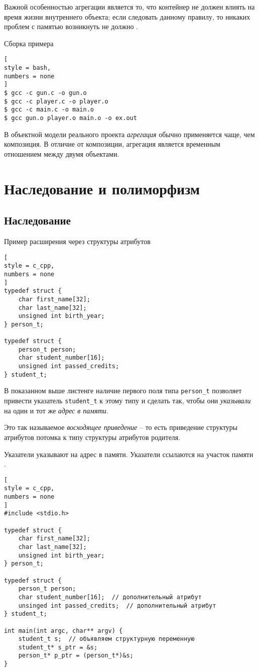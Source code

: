 \documentclass[%
	11pt,
	a4paper,
	utf8,
		]{article}
\begin{document}
Важной особенностью агрегации является то, что {\color{red}контейнер не должен влиять на время жизни внутреннего объекта}; если следовать данному правилу, то никаких проблем с памятью возникнуть не должно \cite[]{amini-extreme-c:2022}.

Сборка примера
\begin{lstlisting}[
style = bash,
numbers = none
]
$ gcc -c gun.c -o gun.o
$ gcc -c player.c -o player.o
$ gcc -c main.c -o main.o
$ gcc gun.o player.o main.o -o ex.out
\end{lstlisting}

В объектной модели реального проекта \emph{агрегация} обычно применяется чаще, чем композиция. В отличие от композиции, агрегация является временным отношением между двумя объектами.

\section{Наследование и полиморфизм}

\subsection{Наследование}

Пример расширения через структуры атрибутов
\begin{lstlisting}[
style = c_cpp,
numbers = none
]
typedef struct {
    char first_name[32];
    char last_name[32];
    unsigned int birth_year;
} person_t;

typedef struct {
    person_t person;
    char student_number[16];
    unsigned int passed_credits;
} student_t;
\end{lstlisting}

В показанном выше листенге наличие первого поля типа \verb|person_t| позволяет привести указатель \verb|student_t| к этому типу и сделать так, чтобы они \emph{указывали} на один и тот же \emph{адрес в памяти}.

Это так называемое \emph{восходящее приведение} -- то есть приведение структуры атрибутов потомка к типу структуры атрибутов родителя.

Указатели указывают на адрес в памяти. Указатели ссылаются на участок памяти \cite[]{amini-extreme-c:2022}.

\begin{lstlisting}[
style = c_cpp,
numbers = none
]
#include <stdio.h>

typedef struct {
    char first_name[32];
    char last_name[32];
    unsigned int birth_year;
} person_t;

typedef struct {
    person_t person;
    char student_number[16];  // дополнительный атрибут
    unsinged int passed_credits;  // дополнительный атрибут
} student_t;

int main(int argc, char** argv) {
    student_t s;  // объявляем структурную переменную
    student_t* s_ptr = &s;
    person_t* p_ptr = (person_t*)&s;
}
\end{lstlisting}
\end{document}
